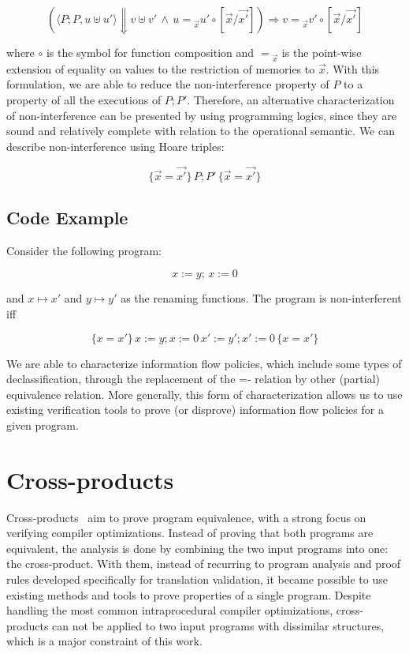 \[ (\langle P; P, u \uplus u' \rangle \Downarrow v \uplus v' \, \land \, u = {}_{\overrightarrow{x}} u' \circ [\overrightarrow{x} / \overrightarrow{x'}]) \Rightarrow v = {}_{\overrightarrow{x}} v' \circ [\overrightarrow{x} / \overrightarrow{x'}] \]

where $\circ$ is the symbol for function composition and \(= {}_{\overrightarrow{x}}\) is the point-wise extension of equality on values to the restriction of memories to $\overrightarrow{x}$.
With this formulation, we are able to reduce the non-interference property of \(P\) to a property of all the executions of \(P; P'\).
Therefore, an alternative characterization of non-interference can be presented by using programming logics, since they are sound and relatively complete with relation to the operational semantic.
We can describe non-interference using Hoare triples:

\[ \{\overrightarrow{x} = \overrightarrow{x'}\} \, P; P' \, \{\overrightarrow{x} = \overrightarrow{x'}\} \]


\subsection{Code Example}
\label{subsec:self_composition_example}

Consider the following program:

\[ x := y; \, x := 0 \]

and \(x \mapsto x'\) and \(y \mapsto y'\) as the renaming functions. 
The program is non-interferent iff

\[ \{x = x'\} \, x := y; x := 0 \, x' := y'; x' := 0 \, \{x = x'\} \]

We are able to characterize information flow policies, which include some types of declassification, through the replacement of the =- relation by other (partial) equivalence relation.
More generally, this form of characterization allows us to use existing verification tools to prove (or disprove) information flow policies for a given program.


\FloatBarrier
\section{Cross-products} 
\label{sec:cross_products}

Cross-products~\cite{DBLP:conf/fm/ZaksP08} aim to prove program equivalence, with a strong focus on verifying compiler optimizations.
Instead of proving that both programs are equivalent, the analysis is done by combining the two input programs into one: the cross-product.
With them, instead of recurring to program analysis and proof rules developed specifically for translation validation, it became possible to use existing methods and tools to prove properties of a single program. 
Despite handling the most common intraprocedural compiler optimizations, cross-products can not be applied to two input programs with dissimilar structures, which is a major constraint of this work.

